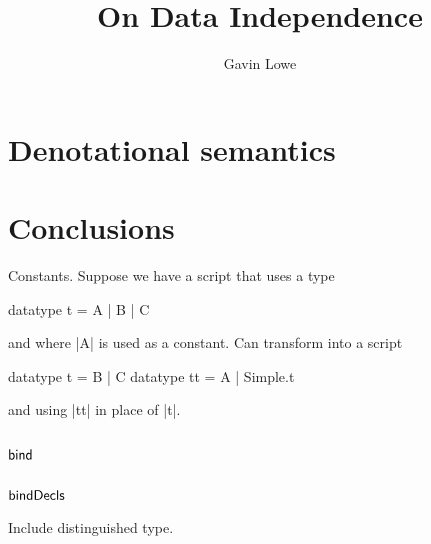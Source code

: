 \documentclass[12pt,a4paper]{article}
\title{On Data Independence}
\author{Gavin Lowe}
\def\bind{\mathop{\sf bind}\nolimits}
\def\bindDecls{\mathop{\sf bindDecls}}
\begin{document}
\maketitle





\section{Denotational semantics}

\section{Conclusions}

Constants.  Suppose we have a script that uses a type
\begin{cspm}
datatype t = A | B | C
\end{cspm}
and where |A| is used as a constant.
Can transform into a script 
\begin{cspm}
datatype t = B | C
datatype tt = A | Simple.t
\end{cspm}
and using |tt| in place of |t|.

\appendix




\subsection{$\bind$}

\subsection{$\bindDecls$}
\label{sec:bindDecls}

Include distinguished type.

\end{document}

